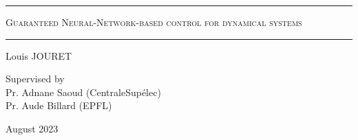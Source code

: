 \documentclass{article}
\begin{document}
\begin{titlepage}


\begin{center}

    

\vspace{15pt}
\hrule
\vspace{0.5cm}
\textsc{\LARGE{Guaranteed Neural-Network-based control for dynamical systems}\\
    \vspace{5pt}}
\vspace{0.5cm}
\hrule
\vspace{1cm}





\large{Louis JOURET}

\vfill



\vfill

\LARGE{Supervised by}\\
\large{Pr. Adnane Saoud (CentraleSupélec)}\\
\large{Pr. Aude Billard (EPFL)}


\vspace{0.8cm}

\large{August 2023}


\vspace{1.5cm}

\setcounter{page}{0}
\vfill
\end{center}
\end{titlepage}

\tableofcontents


\newpage






\nocite{*}



\end{document}
